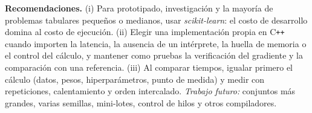 \documentclass[11pt,a4paper]{article}
\newcommand{\cpp}{C\texttt{++}\xspace}
\newcommand{\sk}{\textit{scikit-learn}\xspace}
\begin{document}
\textbf{Recomendaciones.} (i) Para prototipado, investigaci\'on y la mayor\'ia de problemas tabulares peque\~nos o medianos, usar \sk: el costo de desarrollo domina al costo de ejecuci\'on. (ii) Elegir una implementaci\'on propia en \cpp cuando importen la latencia, la ausencia de un int\'erprete, la huella de memoria o el control del c\'alculo, y mantener como pruebas la verificaci\'on del gradiente y la comparaci\'on con una referencia. (iii) Al comparar tiempos, igualar primero el c\'alculo (datos, pesos, hiperpar\'ametros, punto de medida) y medir con repeticiones, calentamiento y orden intercalado. \emph{Trabajo futuro:} conjuntos m\'as grandes, varias semillas, mini-lotes, control de hilos y otros compiladores.



\end{document}
